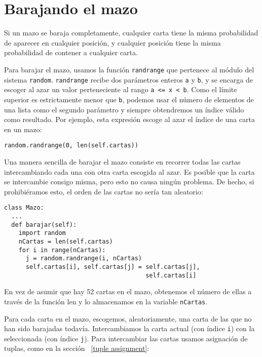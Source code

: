 \section{Barajando el mazo}

Si un mazo se baraja completamente, cualquier carta tiene la misma probabilidad
de aparecer en cualquier posición, y cualquier posición tiene la misma
probabilidad de contener a cualquier carta.


Para barajar el mazo, usamos la función  \texttt{randrange} que pertenece
al módulo del sistema  \texttt{random}.  \texttt{randrange} recibe dos parámetros enteros
\texttt{a} y \texttt{b}, y se encarga de escoger al azar un valor 
perteneciente al rango \texttt{a <= x < b}.  Como el límite superior es 
estrictamente menor que \texttt{b}, podemos usar el número de elementos
de una lista como el segundo parámetro y siempre obtendremos un índice válido
como resultado. Por ejemplo, esta expresión escoge al azar el índice de una carta en un mazo:

\beforeverb
\begin{verbatim}
random.randrange(0, len(self.cartas))
\end{verbatim}
\afterverb
%
Una manera sencilla de barajar el mazo consiste en recorrer todas las cartas 
intercambiando cada una con otra carta escogida al azar. Es posible que
la carta se intercambie consigo misma, pero esto no causa ningún problema. De
hecho, si prohibiéramos esto, el orden de las cartas no sería tan aleatorio:



\beforeverb
\begin{verbatim}
class Mazo:
  ...
  def barajar(self):
    import random
    nCartas = len(self.cartas)
    for i in range(nCartas):
      j = random.randrange(i, nCartas)
      self.cartas[i], self.cartas[j] = self.cartas[j], 
                                       self.cartas[i]
\end{verbatim}
\afterverb
%
En vez de asumir que hay 52 cartas en el mazo, obtenemos el número de ellas
a través de la función len y lo almacenamos en la variable  \texttt{nCartas}.


Para cada carta en el mazo, escogemos, aleatoriamente, una carta de las
que no han sido barajadas todavía. Intercambiamos la carta actual (con índice
\texttt{i}) con la seleccionada (con índice \texttt{j}).  Para intercambiar
las cartas usamos asignación de tuplas, como en la sección ~\ref{tuple assignment}:

